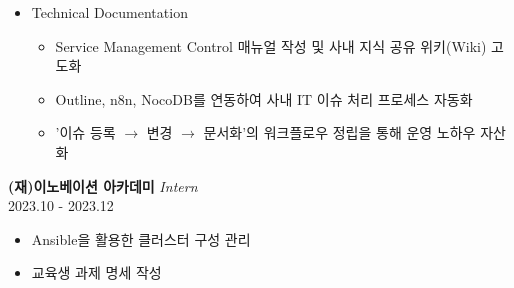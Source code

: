 \documentclass[10pt, a4paper]{article}
\newcommand{\descstyle}{\lightfont\fontsize{9.5pt}{10pt}\selectfont}
\newcommand{\jobtitle}[2]{{\normalsize\textbf{#1}} \hfill {\descstyle\textit{#2}}}
\newcommand{\dates}[1]{\hfill {\descstyle\color{lightGray} #1}}
\begin{document}
\begin{minipage}[t]{0.62\textwidth}
\begin{itemize}[label=\textbullet]
        \item Technical Documentation
        \begin{itemize}
            \item Service Management Control 매뉴얼 작성 및 사내 지식 공유 위키(Wiki) 고도화
            \item Outline, n8n, NocoDB를 연동하여 사내 IT 이슈 처리 프로세스 자동화
            \item '이슈 등록 $\rightarrow$ 변경 $\rightarrow$ 문서화'의 워크플로우 정립을 통해 운영 노하우 자산화
        \end{itemize}
    \end{itemize}

    \vspace{1.2em} %

    \jobtitle{(재)이노베이션 아카데미}{Intern} \\
    \dates{2023.10 - 2023.12}
    \begin{itemize}[label=\textbullet]
        \descstyle 
        \item Ansible을 활용한 클러스터 구성 관리
        \item 교육생 과제 명세 작성
    \end{itemize}

    \vspace{1.0em}

\end{minipage}
\end{document}
